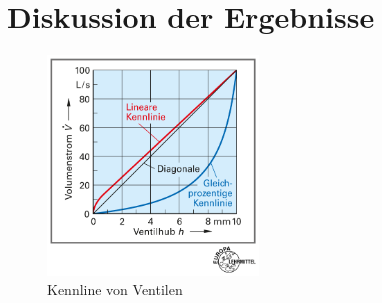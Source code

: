 \section{Diskussion der Ergebnisse}
\label{sec:diskussion}


\begin{figure}[h!]
	\centering
	\includegraphics[width=0.5\textwidth]{img/035-3}
	\caption{Kennline von Ventilen \cite[S.35, Bild 3]{Ignatowitz.2013}}
	\label{fig:kennlinie_ct}
\end{figure}
\FloatBarrier
